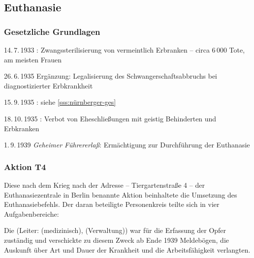 
\subsection{Euthanasie}
\label{ssc:Euthanasie}

\subsubsection{Gesetzliche Grundlagen}

\begin{chronik}
\item[14.\,7.\,1933] :
Zwangssterilisierung von vermeintlich Erbranken -- circa 6\,000 Tote,
am meisten Frauen

\item[26.\,6.\,1935]
Ergänzung: Legalisierung des Schwangerschaftsabbruchs bei
diagnostizierter Erbkrankheit

\item[15.\,9.\,1935]
:
siehe \ref{sss:nürnberger-ges}

\item[18.\,10.\,1935]
: Verbot von Eheschließungen mit geistig
Behinderten und Erbkranken

\item[1.\,9.\,1939]
\emph{Geheimer Führererlaß}: Ermächtigung zur Durchführung der
Euthanasie
\end{chronik}

\subsubsection{Aktion T4}

\setlength{\parskip}{0mm}

Diese nach dem Krieg nach der Adresse -- Tiergartenstraße 4 -- der
Euthanasiezentrale in Berlin benannte Aktion beinhaltete die Umsetzung
des Euthanasiebefehls. Der daran beteiligte Personenkreis teilte
sich in vier Aufgabenbereiche:

Die  (Leiter:
 (medizinisch),  (Verwaltung)) war für die Erfassung der Opfer
zuständig und verschickte zu diesem Zweck ab Ende 1939 Meldebögen, die
Auskunft über Art und Dauer der Krankheit und die Arbeitsfähigkeit
verlangten.

